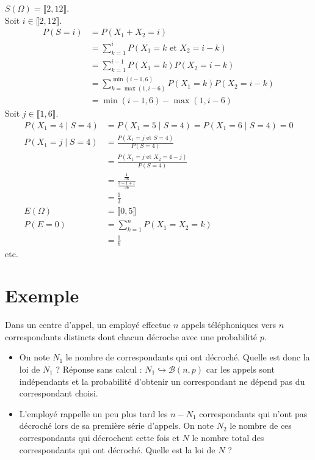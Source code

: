 \documentclass[../main.tex]{subfiles}
\begin{document}
\noindent $S(\Omega) = \llbracket 2, 12 \rrbracket$. \\
Soit $i\in \llbracket 2, 12 \rrbracket$. 
\begin{align*}
    P(S = i) &= P(X_1 + X_2 = i) \\
    &= \sum_{k=1}^{i} P(X_1 = k \text{ et } X_2 = i - k) \\
    &= \sum_{k=1}^{i-1} P(X_1 = k) P(X_2 = i - k) \\
    &= \sum_{k=\max(1, i-6)}^{\min(i-1, 6)} P(X_1 = k) P(X_2 = i - k) \\
    &= \min(i-1, 6) - \max(1, i-6)
\end{align*}
Soit $j\in \llbracket 1, 6 \rrbracket$. 
\begin{align*}
    P(X_1 = 4 \mid S = 4) &= P(X_1 = 5 \mid S = 4) = P(X_1 = 6 \mid S = 4) = 0 \\
    P(X_1 = j \mid S = 4) &= \frac{P(X_1 = j \text{ et } S = 4)}{P(S = 4)} \\
    &= \frac{P(X_1 = j \text{ et } X_2 = 4 - j)}{P(S = 4)} \\
    &= \frac{\frac{1}{36}}{\frac{3-1+1}{36}} \\
    &= \frac{1}{3} \\
    E(\Omega) &= \llbracket 0, 5 \rrbracket \\
    P(E = 0) &= \sum_{k=1}^{n} P(X_1 = X_2 = k) \\
    &= \frac{1}{6}
\end{align*}
etc.

\section{Exemple}
\begin{tcolorbox}[title=Exemple 32.67, title filled=false, colframe=darkgreen, colback=darkgreen!10!white]
    Dans un centre d'appel, un employé effectue $n$ appels téléphoniques vers $n$ correspondants distincts dont chacun décroche avec une probabilité $p$. 
    \begin{itemize}
        \item On note $N_1$ le nombre de correspondants qui ont décroché. Quelle est donc la loi de $N_1$ ? Réponse sans calcul : $N_1 \hookrightarrow \mathcal{B}(n, p)$ car les appels sont indépendants et la probabilité d'obtenir un correspondant ne dépend pas du correspondant choisi.
        \item L'employé rappelle un peu plus tard les $n-N_1$ correspondants qui n'ont pas décroché lors de sa première série d'appels. On note $N_2$ le nombre de ces correspondants qui décrochent cette fois et $N$ le nombre total des correspondants qui ont décroché. Quelle est la loi de $N$ ?
    \end{itemize}
\end{tcolorbox}
\end{document}
